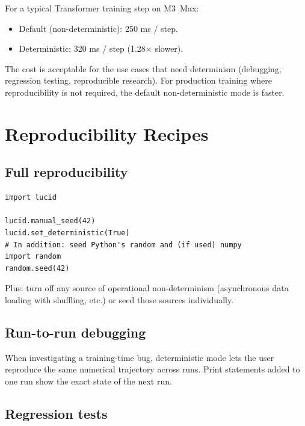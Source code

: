 For a typical Transformer training step on M3~Max:

\begin{itemize}
  \item Default (non-deterministic): 250 ms / step.
  \item Deterministic: 320 ms / step (1.28$\times$ slower).
\end{itemize}

The cost is acceptable for the use cases that need determinism
(debugging, regression testing, reproducible research). For
production training where reproducibility is not required, the
default non-deterministic mode is faster.

\section{Reproducibility Recipes}
\label{sec:profiler_determinism:recipes}

\subsection{Full reproducibility}
\label{ssec:profiler_determinism:full_repro}

\begin{lstlisting}[style=lucid,language=LucidPython]
import lucid

lucid.manual_seed(42)
lucid.set_deterministic(True)
# In addition: seed Python's random and (if used) numpy
import random
random.seed(42)
\end{lstlisting}

Plus: turn off any source of operational non-determinism
(asynchronous data loading with shuffling, etc.) or seed those
sources individually.

\subsection{Run-to-run debugging}
\label{ssec:profiler_determinism:debug}

When investigating a training-time bug, deterministic mode lets
the user reproduce the same numerical trajectory across runs.
Print statements added to one run show the exact state of the
next run.

\subsection{Regression tests}
\label{ssec:profiler_determinism:regression}

